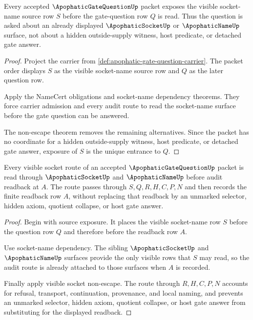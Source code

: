 \begin{theorem}
\label{thm:apophatic-gate-question-source-exposure}
Every accepted $\ApophaticGateQuestionUp$ packet exposes the visible socket-name
source row $S$ before the gate-question row $Q$ is read. Thus the question is
asked about an already displayed $\ApophaticSocketUp$ or $\ApophaticNameUp$
surface, not about a hidden outside-supply witness, host predicate, or detached
gate answer.
\end{theorem}
\begin{proof}
Project the carrier from \autoref{def:apophatic-gate-question-carrier}. The
packet order displays $S$ as the visible socket-name source row and $Q$ as the
later question row.

Apply the NameCert obligations and socket-name dependency theorems. They force
carrier admission and every audit route to read the socket-name surface before
the gate question can be answered.

The non-escape theorem removes the remaining alternatives. Since the packet has
no coordinate for a hidden outside-supply witness, host predicate, or detached
gate answer, exposure of $S$ is the unique entrance to $Q$.
\end{proof}

\begin{theorem}
\label{thm:apophatic-gate-question-visible-socket-coverage}
Every visible socket route of an accepted $\ApophaticGateQuestionUp$ packet is
read through $\ApophaticSocketUp$ and $\ApophaticNameUp$ before audit readback
at $A$. The route passes through $S,Q,R,H,C,P,N$ and then records the finite
readback row $A$, without replacing that readback by an unmarked selector,
hidden axiom, quotient collapse, or host gate answer.
\end{theorem}
\begin{proof}
Begin with source exposure. It places the visible socket-name row $S$ before the
question row $Q$ and therefore before the readback row $A$.

Use socket-name dependency. The sibling $\ApophaticSocketUp$ and
$\ApophaticNameUp$ surfaces provide the only visible rows that $S$ may read, so
the audit route is already attached to those surfaces when $A$ is recorded.

Finally apply visible socket non-escape. The route through $R,H,C,P,N$ accounts
for refusal, transport, continuation, provenance, and local naming, and prevents
an unmarked selector, hidden axiom, quotient collapse, or host gate answer from
substituting for the displayed readback.
\end{proof}

